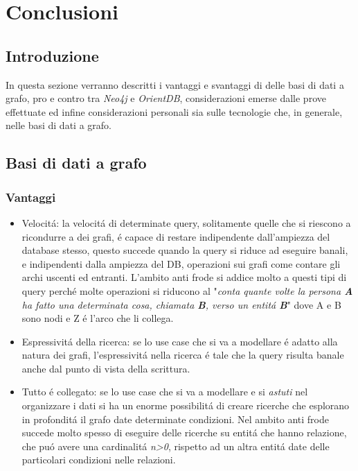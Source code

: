 \section{Conclusioni}

\subsection{Introduzione}
In questa sezione verranno descritti i vantaggi e svantaggi di delle basi di dati a grafo, pro e contro tra \textit{Neo4j} e \textit{OrientDB}, considerazioni emerse dalle prove effettuate ed infine considerazioni personali sia sulle tecnologie che, in generale, nelle basi di dati a grafo.

\subsection{Basi di dati a grafo}
\subsubsection{Vantaggi}
\begin{itemize}
\item{Velocit\'a:} la velocit\'a di determinate query, solitamente quelle che si riescono a ricondurre a dei grafi, \'e capace di restare indipendente dall'ampiezza del database stesso, questo succede quando la query si riduce ad eseguire banali, e indipendenti dalla ampiezza del DB, operazioni sui grafi come contare gli archi uscenti ed entranti. L'ambito anti frode si addice molto a questi tipi di query perch\'e molte operazioni si riducono al "\textit{conta quante volte la persona \textbf{A} ha fatto una determinata cosa, chiamata \textbf{B},  verso un entit\'a \textbf{B}}" dove A e B sono nodi e Z \'e l'arco che li collega.

\item{Espressivit\'a della ricerca:} se lo use case che si va a modellare \'e adatto alla natura dei grafi, l'espressivit\'a nella ricerca \'e tale che la query risulta banale anche dal punto di vista della scrittura. 

\item{Tutto \'e collegato:} se lo use case che si va a modellare e si \textit{astuti} nel organizzare i dati si ha un enorme possibilit\'a di creare ricerche che esplorano in profondit\'a il grafo date determinate condizioni. Nel ambito anti frode succede molto spesso di eseguire delle ricerche su entit\'a che hanno relazione, che pu\'o avere una cardinalit\'a \textit{n>0}, rispetto ad un altra entit\'a date delle particolari condizioni nelle relazioni. 

\end{itemize}

